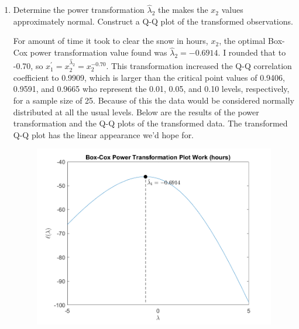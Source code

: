 \begin{enumerate}[label= (\alph*)]
    \item Determine the power transformation $\hat{\lambda}_{2}$ the makes the $x_{2}$ values approximately
    normal. Construct a Q-Q plot of the transformed observations.

    For amount of time it took to clear the snow in hours, $x_{2}$, the optimal Box-Cox power transformation value found was $\hat{\lambda}_{2} = -0.6914$.
    I rounded that to -0.70, so $x_{1}^{\prime} = x_{2}^{\hat{\lambda}_{2}} = x_{2}^{-0.70}$. This transformation increased the Q-Q correlation coefficient to 0.9909, which is larger than the critical point values of 0.9406, 0.9591, and 0.9665 who represent the 0.01, 0.05, and 0.10 levels, respectively, for a sample size of 25.
    Because of this the data would be considered normally distributed at all the usual levels.
    Below are the results of the power transformation and the Q-Q plots of the transformed data.
    The transformed Q-Q plot has the linear appearance we'd hope for.

    \begin{center}
        \begin{figure}[H]
            \centering
            \includegraphics[scale=0.4]{./matlab/chapter-4/sol4.41.power.2.png}
        \end{figure}
    \end{center}
    

\end{enumerate}
